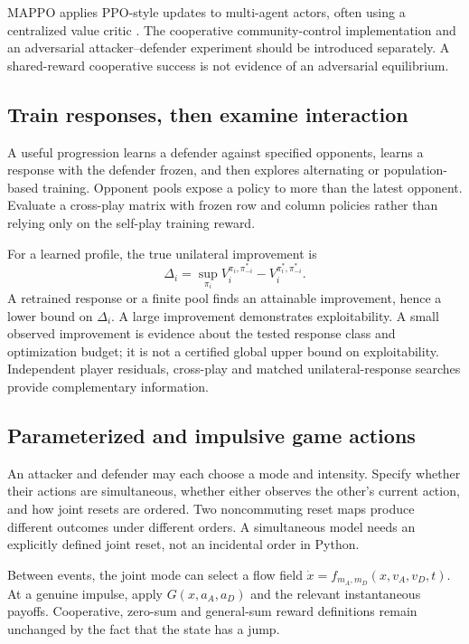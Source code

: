 \documentclass[11pt,a4paper]{article}
\theoremstyle{definition}
\theoremstyle{remark}
\begin{document}
MAPPO applies PPO-style updates to multi-agent actors, often using a centralized value critic \cite{mappo}. The cooperative community-control implementation and an adversarial attacker--defender experiment should be introduced separately. A shared-reward cooperative success is not evidence of an adversarial equilibrium.

\subsection{Train responses, then examine interaction}
A useful progression learns a defender against specified opponents, learns a response with the defender frozen, and then explores alternating or population-based training. Opponent pools expose a policy to more than the latest opponent. Evaluate a cross-play matrix with frozen row and column policies rather than relying only on the self-play training reward.

For a learned profile, the true unilateral improvement is
\begin{equation}
\Delta_i=\sup_{\pi_i}V_i^{\pi_i,\pi_{-i}^*}-V_i^{\pi_i^*,\pi_{-i}^*}.
\end{equation}
A retrained response or a finite pool finds an attainable improvement, hence a lower bound on $\Delta_i$. A large improvement demonstrates exploitability. A small observed improvement is evidence about the tested response class and optimization budget; it is not a certified global upper bound on exploitability. Independent player residuals, cross-play and matched unilateral-response searches provide complementary information.

\subsection{Parameterized and impulsive game actions}
An attacker and defender may each choose a mode and intensity. Specify whether their actions are simultaneous, whether either observes the other's current action, and how joint resets are ordered. Two noncommuting reset maps produce different outcomes under different orders. A simultaneous model needs an explicitly defined joint reset, not an incidental order in Python.

Between events, the joint mode can select a flow field
$\dot x=f_{m_A,m_D}(x,v_A,v_D,t)$. At a genuine impulse, apply $G(x,a_A,a_D)$ and the relevant instantaneous payoffs. Cooperative, zero-sum and general-sum reward definitions remain unchanged by the fact that the state has a jump.
\end{document}
